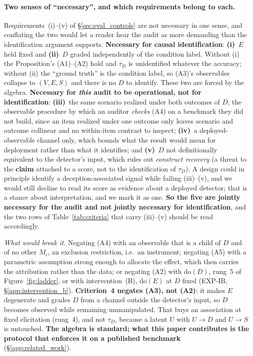 \paragraph{Two senses of ``necessary'', and which requirements belong to each.} Requirements~(i)--(v) of §\ref{sec:eval_controls} are not necessary in one sense, and conflating the two would let a reader hear the audit as more demanding than the identification argument supports. \textbf{Necessary for causal identification}: \textbf{(i)}~$E$ held fixed and \textbf{(ii)}~$D$ graded independently of the condition label. Without (i) the Proposition's (A1)--(A2) hold and $\tau_D$ is unidentified whatever the accuracy; without (ii) the ``ground truth'' is the condition label, so (A3)'s observables collapse to $(V,E,S)$ and there is no $D$ to identify. These two are forced by the algebra. \textbf{Necessary for \emph{this} audit to be operational, not for identification}: \textbf{(iii)}~the same scenario realized under both outcomes of $D$, the observable procedure by which an auditor \emph{checks} (A4) on a benchmark they did not build, since an item realized under one outcome only leaves scenario and outcome collinear and no within-item contrast to inspect; \textbf{(iv)}~a deployed-observable channel only, which bounds what the result would mean for deployment rather than what it identifies; and \textbf{(v)}~$D$ not definitionally equivalent to the detector's input, which rules out \emph{construct recovery} (a threat to the \textbf{claim} attached to a score, not to the identification of $\tau_D$). A design could in principle identify a deception-associated signal while failing (iii)--(v), and we would still decline to read its score as evidence about a deployed detector; that is a stance about interpretation, and we mark it as one. \textbf{So the five are jointly necessary for the audit and not jointly necessary for identification}, and the two rows of Table~\ref{tab:criteria} that carry (iii)--(v) should be read accordingly.

\emph{What would break it.} Negating (A4) with an observable that is a child of $D$ and of no other $M_i$, an exclusion restriction, i.e.\ an instrument; negating (A5) with a parametric assumption strong enough to allocate the effect, which then carries the attribution rather than the data; or negating (A2) with $\mathrm{do}(D)$, rung~5 of Figure~\ref{fig:ladder}, or with intervention~(B), $\mathrm{do}(E)$ at $D$ fixed (EXP-IB, §\ref{app:intervention_b}). \textbf{Criterion~4 negates (A3), not (A2)}: it makes $E$ degenerate and grades $D$ from a channel outside the detector's input, so $D$ becomes observed while remaining unmanipulated. That buys an association at fixed elicitation (rung~4), and not $\tau_D$, because a latent $U$ with $U\!\to\!D$ and $U\!\to\!S$ is untouched. \textbf{The algebra is standard; what this paper contributes is the protocol that enforces it on a published benchmark} (§\ref{app:related_work}).

